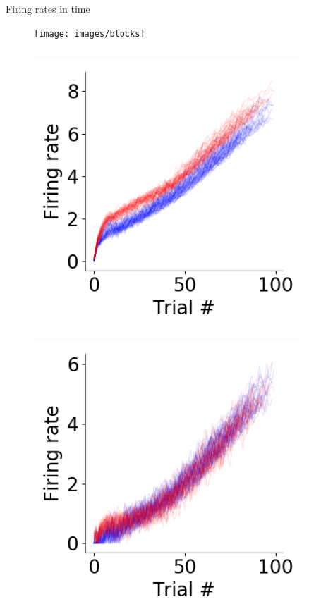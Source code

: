 \documentclass[14pt]{beamer}
\begin{document}
\begin{frame}{Firing rates in time}

  \begin{figure}[htb]
  \texttt{[image: images/blocks]}
  \end{figure}
  \vspace{-1cm}
\begin{columns}
\begin{column}{0.3\textwidth}

  \begin{figure}
  \includegraphics[width=0.9\textwidth]{images/ptask/timecourse-32}
  \end{figure}
  \vspace{-1cm}
  \begin{figure}
  \includegraphics[width=0.9\textwidth]{images/ptask/timecourse-11}
  \end{figure}



\end{column}
\end{columns}
\end{frame}
\end{document}
